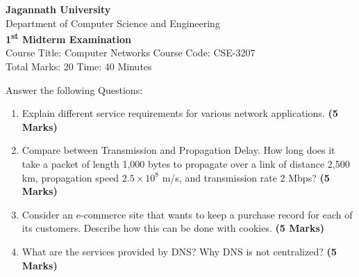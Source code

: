 \documentclass{article}
\begin{document}
\begin{center}
    \textbf{Jagannath University} \\
    Department of Computer Science and Engineering \\
    \textbf{1\textsuperscript{st} Midterm Examination} \\
    Course Title: Computer Networks \hspace{0.2cm} Course Code: CSE-3207 \\
    Total Marks: 20 \hspace{0.2cm} Time: 40 Minutes
\end{center}

\noindent Answer the following Questions:

\begin{enumerate}
    \item Explain different service requirements for various network applications. \hspace{1cm} \textbf{(5 Marks)}
    \item Compare between Transmission and Propagation Delay. How long does it take a packet of length 1,000 bytes to propagate over a link of distance 2,500 km, propagation speed \(2.5 \times 10^8\) m/s, and transmission rate 2 Mbps? \hspace{1cm} \textbf{(5 Marks)}
    \item Consider an e-commerce site that wants to keep a purchase record for each of its customers. Describe how this can be done with cookies. \hspace{1cm} \textbf{(5 Marks)}
    \item What are the services provided by DNS? Why DNS is not centralized? \hspace{1cm} \textbf{(5 Marks)}
\end{enumerate}
\end{document}
